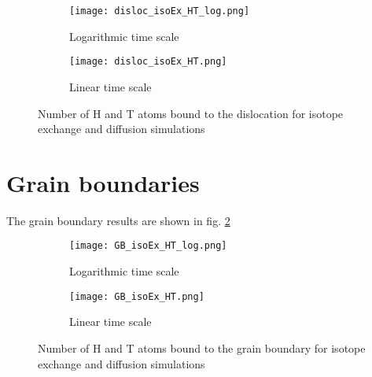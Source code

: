 \begin{figure}[ht]
\begin{subfigure}{.5\textwidth}
  \centering
 \texttt{[image: disloc\_isoEx\_HT\_log.png]}  
  \caption{Logarithmic time scale}
\end{subfigure}
\begin{subfigure}{.5\textwidth}
  \centering
  \texttt{[image: disloc\_isoEx\_HT.png]}  
  \caption{Linear time scale}
\end{subfigure}
   \caption{Number of H and T atoms bound to the dislocation for isotope exchange and diffusion simulations}
   \label{Fig:disloc_results} 
\end{figure}



\section{Grain boundaries}
The grain boundary results are shown in fig. \ref{Fig:GB_results}

\begin{figure}[ht]
\begin{subfigure}{.5\textwidth}
  \centering
 \texttt{[image: GB\_isoEx\_HT\_log.png]}  
  \caption{Logarithmic time scale}
\end{subfigure}
\begin{subfigure}{.5\textwidth}
  \centering
  \texttt{[image: GB\_isoEx\_HT.png]}  
  \caption{Linear time scale}
\end{subfigure}
   \caption{Number of H and T atoms bound to the grain boundary for isotope exchange and diffusion simulations}
   \label{Fig:GB_results} 
\end{figure}

